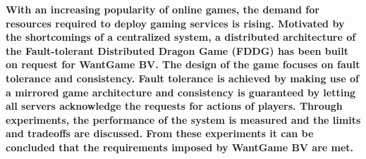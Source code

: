\textbf{With an increasing popularity of online games, the demand for resources required to deploy gaming services is rising.
	Motivated by the shortcomings of a centralized system, a distributed architecture of the Fault-tolerant Distributed Dragon Game (FDDG) has been built on request for WantGame BV. 
	The design of the game focuses on fault tolerance and consistency.
	Fault tolerance is achieved by making use of a mirrored game architecture and consistency is guaranteed by letting all servers acknowledge the requests for actions of players. 
	Through experiments, the performance of the system is measured and the limits and tradeoffs are discussed.
	From these experiments it can be concluded that the requirements imposed by WantGame BV are met.}